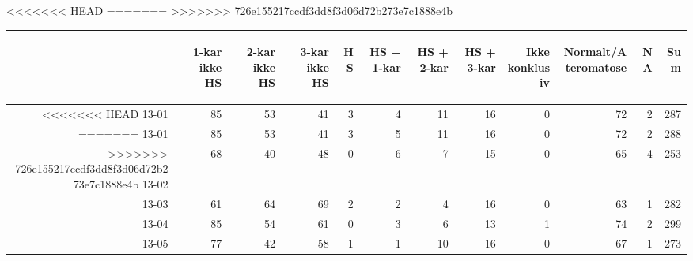 \documentclass[presentation,xcolor=pdftex,dvipsnames,table]{beamer}
\begin{document}
\begin{frame}
\begin{tiny}
<<<<<<< HEAD
=======
>>>>>>> 726e155217ccdf3dd8f3d06d72b273e7c1888e4b
\begin{table}[ht]
\centering
\begin{tabular}{rrrrrrrrrrrr}
  \toprule
 & \begin{sideways} 1-kar ikke HS \end{sideways} & \begin{sideways} 2-kar ikke HS \end{sideways} & \begin{sideways} 3-kar ikke HS \end{sideways} & \begin{sideways} HS \end{sideways} & \begin{sideways} HS + 1-kar \end{sideways} & \begin{sideways} HS + 2-kar \end{sideways} & \begin{sideways} HS + 3-kar \end{sideways} & \begin{sideways} Ikke konklusiv \end{sideways} & \begin{sideways} Normalt/Ateromatose \end{sideways} & \begin{sideways} NA \end{sideways} & \begin{sideways} Sum \end{sideways} \\ 
  \midrule
<<<<<<< HEAD
13-01 & 85 & 53 & 41 & 3 & 4 & 11 & 16 & 0 & 72 & 2 & 287 \\ 
=======
13-01 & 85 & 53 & 41 & 3 & 5 & 11 & 16 & 0 & 72 & 2 & 288 \\ 
>>>>>>> 726e155217ccdf3dd8f3d06d72b273e7c1888e4b
  13-02 & 68 & 40 & 48 & 0 & 6 & 7 & 15 & 0 & 65 & 4 & 253 \\ 
  13-03 & 61 & 64 & 69 & 2 & 2 & 4 & 16 & 0 & 63 & 1 & 282 \\ 
  13-04 & 85 & 54 & 61 & 0 & 3 & 6 & 13 & 1 & 74 & 2 & 299 \\ 
  13-05 & 77 & 42 & 58 & 1 & 1 & 10 & 16 & 0 & 67 & 1 & 273 \\ 

\end{tabular}
\end{table}
\end{tiny}
\end{frame}
\end{document}
